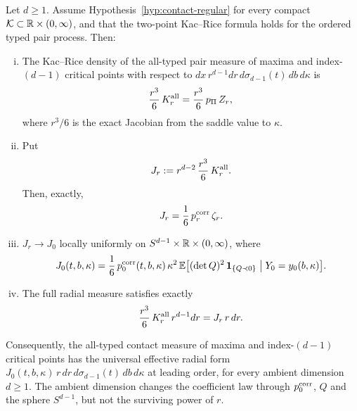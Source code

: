 \begin{theorem}\label{thm:contact-cancellation}
Let $d\ge1$. Assume Hypothesis~\ref{hyp:contact-regular} for every compact $\mathcal K\subset\mathbb R\times(0,\infty)$, and that the two-point Kac--Rice formula holds for the ordered typed pair process. Then:
\begin{enumerate}[(i)]
\item The Kac--Rice density of the all-typed pair measure of maxima and index-$(d-1)$ critical points with respect to $dx\,r^{d-1}dr\,d\sigma_{d-1}(t)\,db\,d\kappa$ is
\begin{equation}\label{eq:contact-KR}
\frac{r^3}6\,K^{\rm all}_r=\frac{r^3}6\,p_\Pi\,Z_r ,
\end{equation}
where $r^3/6$ is the exact Jacobian from the saddle value to $\kappa$.
\item Put
\begin{equation}\label{eq:contact-J}
J_r:=r^{d-2}\,\frac{r^3}6\,K^{\rm all}_r .
\end{equation}
Then, exactly,
\begin{equation}\label{eq:contact-Jexact}
J_r=\frac16\,p^{\rm corr}_r\,\zeta_r .
\end{equation}
\item $J_r\to J_0$ locally uniformly on $S^{d-1}\times\mathbb R\times(0,\infty)$, where
\begin{equation}\label{eq:contact-J0}
J_0(t,b,\kappa)=\frac16\,p^{\rm corr}_0(t,b,\kappa)\,\kappa^2\,\mathbb E\bigl[(\det Q)^2\,\mathbf 1_{\{Q\prec0\}}\bigm|Y_0=y_0(b,\kappa)\bigr].
\end{equation}
\item The full radial measure satisfies exactly
\begin{equation}\label{eq:contact-radial}
\frac{r^3}6\,K^{\rm all}_r\,r^{d-1}dr=J_r\,r\,dr .
\end{equation}
\end{enumerate}
Consequently, the all-typed contact measure of maxima and index-$(d-1)$ critical points has the universal effective radial form $J_0(t,b,\kappa)\,r\,dr\,d\sigma_{d-1}(t)\,db\,d\kappa$ at leading order, for every ambient dimension $d\ge1$. The ambient dimension changes the coefficient law through $p^{\rm corr}_0$, $Q$ and the sphere $S^{d-1}$, but not the surviving power of $r$.
\end{theorem}

